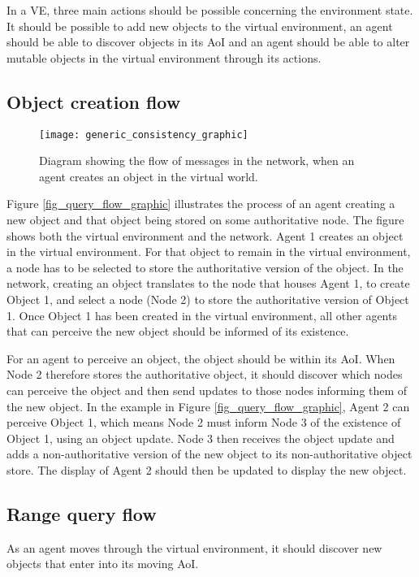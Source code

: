 In a VE, three main actions should be possible concerning the environment state. It should be possible to add new objects to the virtual environment, an agent should be able to discover objects in its AoI and an agent should be able to alter mutable objects in the virtual environment through its actions.

\subsection{Object creation flow}

\begin{figure}[htbp]
 \centering
 \texttt{[image: generic\_consistency\_graphic]}
 \caption{Diagram showing the flow of messages in the network, when an agent creates an object in the virtual world.}
 \label{fig_object_create_graphic}
\end{figure}
%
Figure \ref{fig_query_flow_graphic} illustrates the process of an agent creating a new object and that object being stored on some authoritative node. The figure shows both the virtual environment and the network. Agent 1 creates an object in the virtual environment. For that object to remain in the virtual environment, a node has to be selected to store the authoritative version of the object. In the network, creating an object translates to the node that houses Agent 1, to create Object 1, and select a node (Node 2) to store the authoritative version of Object 1. Once Object 1 has been created in the virtual environment, all other agents that can perceive the new object should be informed of its existence.

For an agent to perceive an object, the object should be within its AoI. When Node 2 therefore stores the authoritative object, it should discover which nodes can perceive the object and then send updates to those nodes informing them of the new object. In the example in Figure \ref{fig_query_flow_graphic}, Agent 2 can perceive Object 1, which means Node 2 must inform Node 3 of the existence of Object 1, using an object update. Node 3 then receives the object update and adds a non-authoritative version of the new object to its non-authoritative object store. The display of Agent 2 should then be updated to display the new object.

\subsection{Range query flow}
As an agent moves through the virtual environment, it should discover new objects that enter into its moving AoI.

